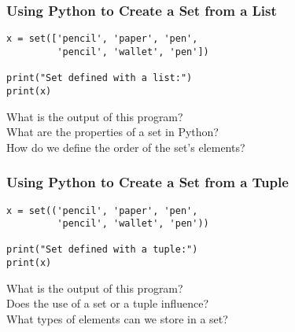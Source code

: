 \documentclass[14pt,aspectratio=169]{beamer}
\begin{document}
%
\begin{frame}[fragile]
  \frametitle{Using Python to Create a Set from a List}
  \normalsize
  \begin{minipage}{6in}
    \vspace*{.25in}
    \begin{verbatim}
x = set(['pencil', 'paper', 'pen',
         'pencil', 'wallet', 'pen'])

print("Set defined with a list:")
print(x)
    \end{verbatim}
  \end{minipage}
  \vspace*{.25in}
  \begin{center}
    \normalsize \noindent What is the output of this program? \\
    \normalsize \noindent What are the properties of a set in Python? \\
    \normalsize \noindent How do we define the order of the set's elements? \\
  \end{center}
\end{frame}

%
\begin{frame}[fragile]
  \frametitle{Using Python to Create a Set from a Tuple}
  \normalsize
  \begin{minipage}{6in}
    \vspace*{.25in}
    \begin{verbatim}
x = set(('pencil', 'paper', 'pen',
         'pencil', 'wallet', 'pen'))

print("Set defined with a tuple:")
print(x)
    \end{verbatim}
  \end{minipage}
  \vspace*{.25in}
  \begin{center}
    \normalsize \noindent What is the output of this program? \\
    \normalsize \noindent Does the use of a set or a tuple influence? \\
    \normalsize \noindent What types of elements can we store in a set? \\
  \end{center}
\end{frame}
\end{document}
